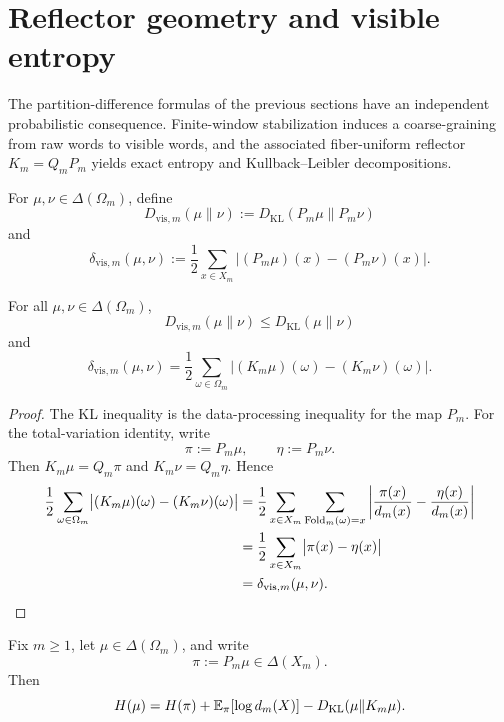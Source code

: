 \section{Reflector geometry and visible entropy}\label{sec:ledger}

The partition-difference formulas of the previous sections have an independent
probabilistic consequence.  Finite-window stabilization induces a
coarse-graining from raw words to visible words, and the associated
fiber-uniform reflector \(K_m=Q_mP_m\) yields exact entropy and
Kullback--Leibler decompositions.

\begin{definition}
\label{def:visible-divergence}
For \(\mu,\nu\in\Delta(\Omega_m)\), define
\[
  D_{\mathrm{vis},m}(\mu\|\nu)
  :=
  D_{\mathrm{KL}}(P_m\mu\|P_m\nu)
\]
and
\[
  \delta_{\mathrm{vis},m}(\mu,\nu)
  :=
  \frac12\sum_{x\in X_m}\bigl|(P_m\mu)(x)-(P_m\nu)(x)\bigr|.
\]
\end{definition}

\begin{proposition}
\label{prop:visible-contraction}
For all \(\mu,\nu\in\Delta(\Omega_m)\),
\[
  D_{\mathrm{vis},m}(\mu\|\nu)\le D_{\mathrm{KL}}(\mu\|\nu)
\]
and
\[
  \delta_{\mathrm{vis},m}(\mu,\nu)
  =
  \frac12\sum_{\omega\in\Omega_m}
  \bigl|(K_m\mu)(\omega)-(K_m\nu)(\omega)\bigr|.
\]
\end{proposition}

\begin{proof}
The KL inequality is the data-processing inequality for the map \(P_m\).  For
the total-variation identity, write
\[
  \pi:=P_m\mu,
  \qquad
  \eta:=P_m\nu.
\]
Then \(K_m\mu=Q_m\pi\) and \(K_m\nu=Q_m\eta\).  Hence
\begin{align*}
  \frac12\sum_{\omega\in\Omega_m}
  \bigl|(K_m\mu)(\omega)-(K_m\nu)(\omega)\bigr|
  &=
  \frac12\sum_{x\in X_m}
  \sum_{\mathrm{Fold}_m(\omega)=x}
  \left|\frac{\pi(x)}{d_m(x)}-\frac{\eta(x)}{d_m(x)}\right| \\
  &=
  \frac12\sum_{x\in X_m}\bigl|\pi(x)-\eta(x)\bigr| \\
  &=
  \delta_{\mathrm{vis},m}(\mu,\nu).
\end{align*}
\end{proof}

\begin{theorem}
\label{thm:entropy-identity}
Fix \(m\ge 1\), let \(\mu\in\Delta(\Omega_m)\), and write
\[
  \pi:=P_m\mu\in\Delta(X_m).
\]
Then
\[
  H(\mu)
  =
  H(\pi)+\mathbb{E}_\pi[\log d_m(X)]-D_{\mathrm{KL}}(\mu\|K_m\mu).
\]
\end{theorem}

